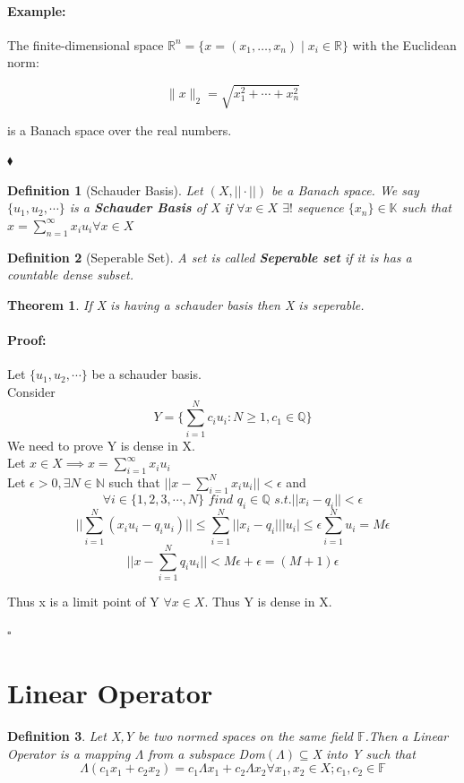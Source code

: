 \documentclass{article}
\newenvironment{proof}{\paragraph{Proof:}}{\hfill$\square$}
\newenvironment{example}{\paragraph{Example:}}{\hfill $\blacklozenge $}
\newcommand{\f}{$\mathbb{F}$}
\newtheorem{definition}{Definition}[section]
\newtheorem{theorem}{Theorem}[section]
\begin{document}
\begin{example}
    The finite-dimensional space $\mathbb{R}^n = \{x = (x_1, \ldots, x_n) \mid x_i \in \mathbb{R}\}$ with the Euclidean norm:


    $$\|x\|_2 = \sqrt{x_1^2 + \cdots + x_n^2}$$
    
    
    is a Banach space over the real numbers.
    
        
\end{example}

\begin{definition}[Schauder Basis]
    Let $(X,||\cdot||)$ be a Banach space. We say $\{ u_1,u_2,\cdots    \}$ is a  \textbf{Schauder Basis} of X if $\forall x \in X$ $\exists !$ sequence $\{ x_n  \} \in \mathbb{K}    $  such that $x = \sum_{n = 1}^{\infty} x_i u_i $$\forall x \in X$
    
\end{definition}
\begin{definition}[Seperable Set]
    A set is called \textbf{Seperable set} if it is has a countable dense subset.
\end{definition}
\begin{theorem}
    If X is having a schauder basis then X is seperable.  
\end{theorem}
\begin{proof}
    Let $\{  u_1,u_2, \cdots    \} $ be a schauder basis.\\
    Consider $$Y =\{ \sum_{i = 1}^{N} c_iu_i : N\geq 1, c_1 \in \mathbb{Q} \}$$
    We need to prove Y is dense in X.
    \\ Let $x \in X \implies x= \sum_{i = 1}^{\infty} x_iu_i $
    \\ Let $\epsilon > 0 , \exists N\in \mathbb{N}$ such that $||x - \sum_{i = 1}^{N} x_iu_i || <\epsilon$ and $$\forall i \in \{ 1,2,3,\cdots ,N \}   \textit{   find  $q_i \in \mathbb{Q}$ s.t.}    ||x_i - q_i|| < \epsilon   $$
    $$|| \sum_{i = 1}^{N} (x_iu_i - q_iu_i) ||\leq \sum_{i = 1}^{N} ||x_i-q_i|||u_i|  \leq \epsilon \sum_{i = 1}^{N} u_i = M\epsilon $$
    $$||x- \sum_{i = 1}^{N} q_iu_i ||<M\epsilon + \epsilon = (M+1)\epsilon$$

Thus x is a limit point of Y $\forall x \in X$. Thus Y is dense in X.  


\end{proof}



\section{Linear Operator}
\begin{definition}
    Let X,Y be two normed spaces on the same field \f .Then a Linear Operator is a mapping $\Lambda $ from a subspace Dom$(\Lambda )\subseteq $X into Y such that $$\Lambda (c_1 x_1 +c_2x_2)=c_1\Lambda x_1 +c_2\Lambda x_2 \forall x_1,x_2 \in X ; c_1,c_2 \in \mathbb{F} $$ 
\end{definition}
\end{document}
